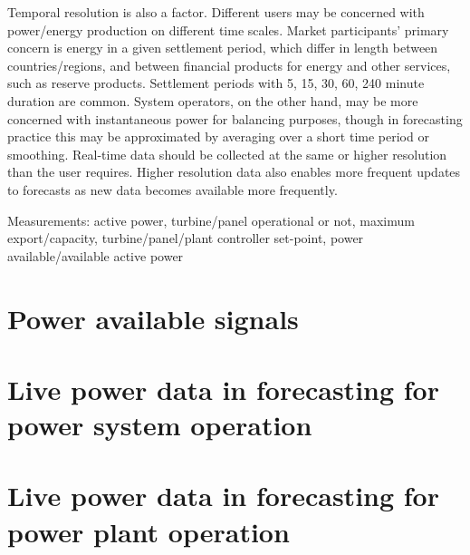 Temporal resolution is also a factor. Different users may be concerned with power/energy production on different time scales. Market participants' primary concern is energy in a given settlement period, which differ in length between countries/regions, and between financial products for energy and other services, such as reserve products. Settlement periods with 5, 15, 30, 60, 240 minute duration are common. System operators, on the other hand, may be more concerned with instantaneous power for balancing purposes, though in forecasting practice this may be approximated by averaging over a short time period or smoothing. Real-time data should be collected at the same or higher resolution than the user requires. Higher resolution data also enables more frequent updates to forecasts as new data becomes available more frequently.


Measurements: active power, turbine/panel operational or not, maximum export/capacity, turbine/panel/plant controller set-point, power available/available active power


\section{Power available signals}
\label{sec:power_available}





\section{Live power data in forecasting for power system operation} 
\label{sec:liva-data-so}




\section{Live power data in forecasting for power plant operation}
\label{sec:live-data-po}
